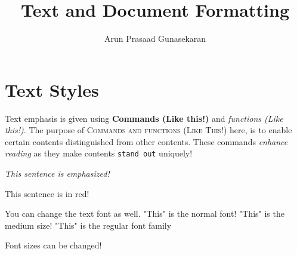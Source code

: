 \documentclass[10pt,a4paper]{article}
\author{Arun Prasaad Gunasekaran}
\title{Text and Document Formatting}
\begin{document}
\maketitle

\tableofcontents

\section{Text Styles}




Text emphasis is given using \textbf{Commands (Like this!)} and \textit{functions (Like this!)}. The purpose of \textsc{Commands and functions (Like This!)} here, is to enable certain contents \textsf{distinguished} from other contents. These commands \textsl{enhance reading} as they make contents \texttt{stand out} uniquely!

\emph{This sentence is \emph{emphasized!}}

\color{red}

This sentence is in red!

\color{black}

You can change the text font as well. \textup{"This"} is the normal font! \textmd{"This"} is the medium size! \textrm{"This"} is the regular font family

Font sizes can be changed!\\ 
\end{document}

